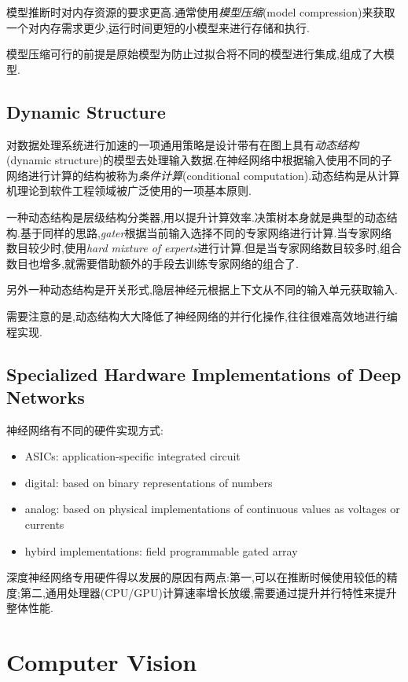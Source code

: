模型推断时对内存资源的要求更高.通常使用\textit{模型压缩}(model compression)来获取一个对内存需求更少,运行时间更短的小模型来进行存储和执行.

模型压缩可行的前提是原始模型为防止过拟合将不同的模型进行集成,组成了大模型.

\subsection{Dynamic Structure}

对数据处理系统进行加速的一项通用策略是设计带有在图上具有\textit{动态结构}(dynamic structure)的模型去处理输入数据.在神经网络中根据输入使用不同的子网络进行计算的结构被称为\textit{条件计算}(conditional computation).动态结构是从计算机理论到软件工程领域被广泛使用的一项基本原则.

一种动态结构是层级结构分类器,用以提升计算效率.决策树本身就是典型的动态结构.基于同样的思路,\textit{gater}根据当前输入选择不同的专家网络进行计算.当专家网络数目较少时,使用\textit{hard mixture of experts}进行计算.但是当专家网络数目较多时,组合数目也增多,就需要借助额外的手段去训练专家网络的组合了.

另外一种动态结构是开关形式,隐层神经元根据上下文从不同的输入单元获取输入.

需要注意的是,动态结构大大降低了神经网络的并行化操作,往往很难高效地进行编程实现.

\subsection{Specialized Hardware Implementations of Deep Networks}

神经网络有不同的硬件实现方式:
\begin{itemize}
    \item ASICs: application-specific integrated circuit
    \item digital: based on binary representations of numbers
    \item analog: based on physical implementations of continuous values as voltages or currents
    \item hybird implementations: field programmable gated array
\end{itemize}

深度神经网络专用硬件得以发展的原因有两点:第一,可以在推断时候使用较低的精度;第二,通用处理器(CPU/GPU)计算速率增长放缓,需要通过提升并行特性来提升整体性能.

\section{Computer Vision}


